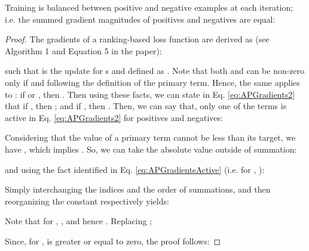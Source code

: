 \documentclass{article}
\newenvironment{customthm}[1]
  {\renewcommand\theinnercustomthm{#1}\innercustomthm}
  {\endinnercustomthm}
\begin{document}
\begin{customthm}{2}
Training is balanced between positive and negative examples at each iteration; i.e. the summed gradient magnitudes of positives and negatives are equal:

\end{customthm}
\begin{proof}
The gradients of a ranking-based loss function are derived as (see Algorithm 1 and Equation 5 in the paper):

such that  is the update for s and defined as . Note that both  and  can be non-zero only if  and  following the definition of the primary term. Hence, the same applies to : if  or , then . Then using these facts, we can state in Eq. \eqref{eq:APGradients2} that if , then ; and if , then . Then, we can say that, only one of the terms is active in Eq. \eqref{eq:APGradients2} for positives and negatives:


Considering that the value of a primary term cannot be less than its target, we have , which implies  . So, we can take the absolute value outside of summation:


and using the fact identified in Eq. \eqref{eq:APGradientsActive} (i.e. for , ):


Simply interchanging the indices and the order of summations, and then reorganizing the constant  respectively yields:


Note that for , , and hence . Replacing ;


Since, for ,  is greater or equal to zero, the proof follows:


\end{proof}
\end{document}
